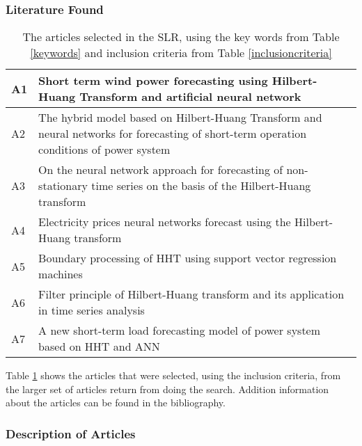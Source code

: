 \subsubsection{Literature Found}
\label{literature}
\begin{table}[h]
\centering
\begin{tabular}{|l|p{12cm}|} \hline
A1 & Short term wind power forecasting using Hilbert-Huang Transform and artificial neural network\cite{annForecastingModel}\\ \hline
A2 & The hybrid model based on Hilbert-Huang Transform and neural networks for forecasting of short-term operation conditions of power system\cite{hhtTransformModel}\\ \hline
A3 & On the neural network approach for forecasting of non-stationary time series on the basis of the Hilbert-Huang transform\cite{neuralNetAproach}\\ \hline
A4 & Electricity prices neural networks forecast using the Hilbert-Huang transform\cite{electricityPrices} \\ \hline
A5 & Boundary processing of HHT using support vector regression machines\cite{boundaryProcessing} \\ \hline
A6 & Filter principle of Hilbert-Huang transform and its application in time series analysis\cite{filter} \\ \hline
A7 & A new short-term load forecasting model of power system based on HHT and ANN \cite{powersystem}\\ \hline
\end{tabular}
\caption{The articles selected in the SLR, using the key words from Table \ref{keywords} and inclusion criteria from Table \ref{inclusioncriteria}}
\label{articles}
\end{table}

Table \ref{articles} shows the articles that were selected, using the inclusion criteria, from the larger set of articles return from doing the search. Addition information about the articles can be found in the bibliography.

\subsubsection{Description of Articles}
\label{description}

